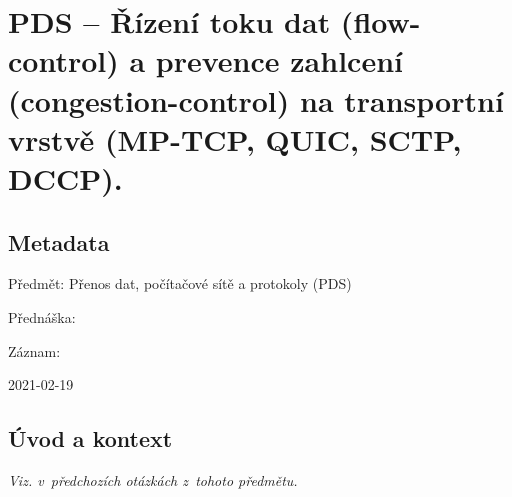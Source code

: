 

\graphicspath{{pds/rizeni_toku_a_prevence_zahlceni/figures}}


\chapter{PDS -- Řízení toku dat (flow-control) a prevence zahlcení (congestion-control) na transportní vrstvě (MP-TCP, QUIC, SCTP, DCCP).}


\section{Metadata}

\begin{compactitem}
    \item Předmět: Přenos dat, počítačové sítě a protokoly (PDS)
    \item Přednáška:
    \begin{compactitem}
        \item {}
    \end{compactitem}
    \item Záznam:
    \begin{compactitem}
        \item 2021-02-19
    \end{compactitem}
\end{compactitem}


\section{Úvod a kontext}

\textit{Viz.  v~předchozích otázkách z~tohoto předmětu.}

